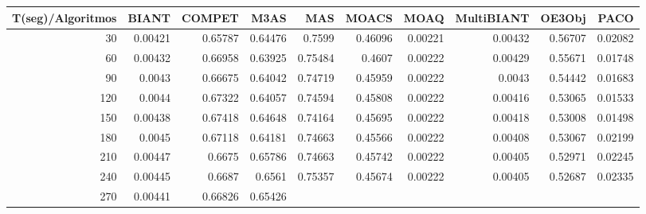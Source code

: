 \begin{table}[h]
    \centering
    \begin{tabular}{|r|r|r|r|r|r|r|r|r|r|}
        \hline \tiny T(seg)/Algoritmos & \tiny {BIANT} & \tiny {COMPET} & \tiny {M3AS} & \tiny
        {MAS} & \tiny {MOACS} & \tiny {MOAQ} & \tiny {MultiBIANT} & \tiny {OE3Obj} & \tiny {PACO} \\
        \hline \tiny 30 &{\tiny 0.00421}    &{\tiny 0.65787}    &{\tiny 0.64476}    &{\tiny 0.7599}
        &{\tiny 0.46096}    &{\tiny 0.00221}    &{\tiny 0.00432}    &{\tiny 0.56707}    &{\tiny 0.02082} \\
        \hline \tiny 60 &{\tiny 0.00432}    &{\tiny 0.66958}    &{\tiny 0.63925}    &{\tiny
        0.75484}    &{\tiny 0.4607}    &{\tiny 0.00222}    &{\tiny 0.00429}    &{\tiny 0.55671}
        &{\tiny 0.01748} \\
        \hline \tiny 90 &{\tiny 0.0043}    &{\tiny 0.66675}    &{\tiny 0.64042}    &{\tiny 0.74719}
        &{\tiny 0.45959}    &{\tiny 0.00222}    &{\tiny 0.0043}    &{\tiny 0.54442}    &{\tiny 0.01683} \\
        \hline \tiny 120 &{\tiny 0.0044}    &{\tiny 0.67322}    &{\tiny 0.64057}    &{\tiny
        0.74594}    &{\tiny 0.45808}    &{\tiny 0.00222}    &{\tiny 0.00416}    &{\tiny 0.53065}
        &{\tiny 0.01533} \\
        \hline \tiny 150 &{\tiny 0.00438}    &{\tiny 0.67418}    &{\tiny 0.64648}    &{\tiny
        0.74164}    &{\tiny 0.45695}    &{\tiny 0.00222}    &{\tiny 0.00418}    &{\tiny 0.53008}
        &{\tiny 0.01498} \\
        \hline \tiny 180 &{\tiny 0.0045}    &{\tiny 0.67118}    &{\tiny 0.64181}    &{\tiny
        0.74663}    &{\tiny 0.45566}    &{\tiny 0.00222}    &{\tiny 0.00408}    &{\tiny 0.53067}
        &{\tiny 0.02199} \\
        \hline \tiny 210 &{\tiny 0.00447}    &{\tiny 0.6675}    &{\tiny 0.65786}    &{\tiny
        0.74663}    &{\tiny 0.45742}    &{\tiny 0.00222}    &{\tiny 0.00405}    &{\tiny 0.52971}
        &{\tiny 0.02245} \\
        \hline \tiny 240 &{\tiny 0.00445}    &{\tiny 0.6687}    &{\tiny 0.6561}    &{\tiny 0.75357}
        &{\tiny 0.45674}    &{\tiny 0.00222}    &{\tiny 0.00405}    &{\tiny 0.52687}    &{\tiny 0.02335} \\
        \hline \tiny 270 &{\tiny 0.00441}    &{\tiny 0.66826}    &{\tiny 0.65426}    &{\tiny
}
\end{tabular}
\end{table}
